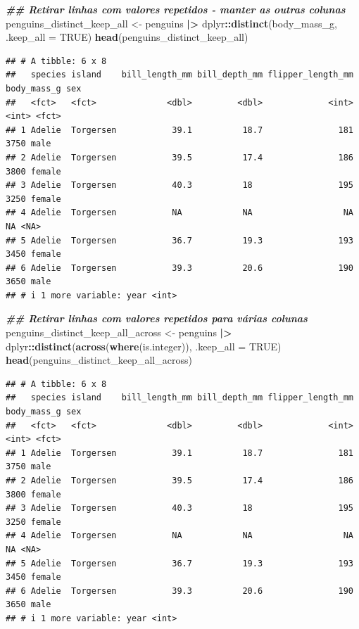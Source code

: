 \documentclass[
]{article}
\newenvironment{Shaded}{\begin{snugshade}}{\end{snugshade}}
\newcommand{\AttributeTok}[1]{\textcolor[rgb]{0.13,0.29,0.53}{#1}}
\newcommand{\ConstantTok}[1]{\textcolor[rgb]{0.56,0.35,0.01}{#1}}
\newcommand{\DocumentationTok}[1]{\textcolor[rgb]{0.56,0.35,0.01}{\textbf{\textit{#1}}}}
\newcommand{\FunctionTok}[1]{\textcolor[rgb]{0.13,0.29,0.53}{\textbf{#1}}}
\newcommand{\NormalTok}[1]{#1}
\newcommand{\OtherTok}[1]{\textcolor[rgb]{0.56,0.35,0.01}{#1}}
\newcommand{\SpecialCharTok}[1]{\textcolor[rgb]{0.81,0.36,0.00}{\textbf{#1}}}
\begin{document}
\begin{Shaded}
\begin{Highlighting}[]
\DocumentationTok{\#\# Retirar linhas com valores repetidos {-} manter as outras colunas}
\NormalTok{penguins\_distinct\_keep\_all }\OtherTok{\textless{}{-}}\NormalTok{ penguins }\SpecialCharTok{|\textgreater{}} 
\NormalTok{    dplyr}\SpecialCharTok{::}\FunctionTok{distinct}\NormalTok{(body\_mass\_g, }\AttributeTok{.keep\_all =} \ConstantTok{TRUE}\NormalTok{)}
\FunctionTok{head}\NormalTok{(penguins\_distinct\_keep\_all)}
\end{Highlighting}
\end{Shaded}

\begin{verbatim}
## # A tibble: 6 x 8
##   species island    bill_length_mm bill_depth_mm flipper_length_mm body_mass_g sex   
##   <fct>   <fct>              <dbl>         <dbl>             <int>       <int> <fct> 
## 1 Adelie  Torgersen           39.1          18.7               181        3750 male  
## 2 Adelie  Torgersen           39.5          17.4               186        3800 female
## 3 Adelie  Torgersen           40.3          18                 195        3250 female
## 4 Adelie  Torgersen           NA            NA                  NA          NA <NA>  
## 5 Adelie  Torgersen           36.7          19.3               193        3450 female
## 6 Adelie  Torgersen           39.3          20.6               190        3650 male  
## # i 1 more variable: year <int>
\end{verbatim}

\begin{Shaded}
\begin{Highlighting}[]
\DocumentationTok{\#\# Retirar linhas com valores repetidos para várias colunas}
\NormalTok{penguins\_distinct\_keep\_all\_across }\OtherTok{\textless{}{-}}\NormalTok{ penguins }\SpecialCharTok{|\textgreater{}} 
\NormalTok{    dplyr}\SpecialCharTok{::}\FunctionTok{distinct}\NormalTok{(}\FunctionTok{across}\NormalTok{(}\FunctionTok{where}\NormalTok{(is.integer)), }\AttributeTok{.keep\_all =} \ConstantTok{TRUE}\NormalTok{)}
\FunctionTok{head}\NormalTok{(penguins\_distinct\_keep\_all\_across)}
\end{Highlighting}
\end{Shaded}

\begin{verbatim}
## # A tibble: 6 x 8
##   species island    bill_length_mm bill_depth_mm flipper_length_mm body_mass_g sex   
##   <fct>   <fct>              <dbl>         <dbl>             <int>       <int> <fct> 
## 1 Adelie  Torgersen           39.1          18.7               181        3750 male  
## 2 Adelie  Torgersen           39.5          17.4               186        3800 female
## 3 Adelie  Torgersen           40.3          18                 195        3250 female
## 4 Adelie  Torgersen           NA            NA                  NA          NA <NA>  
## 5 Adelie  Torgersen           36.7          19.3               193        3450 female
## 6 Adelie  Torgersen           39.3          20.6               190        3650 male  
## # i 1 more variable: year <int>
\end{verbatim}
\end{document}
